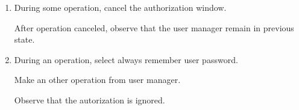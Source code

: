 \documentclass[a4paper,10pt]{article}
\begin{document}
\begin{enumerate}
\item During some operation, cancel the authorization window.

After operation canceled, observe that the user manager remain in previous state.

\item During an operation, select always remember user password.

Make an other operation from user manager.

Observe that the autorization is ignored.


\end{enumerate}
\end{document}
